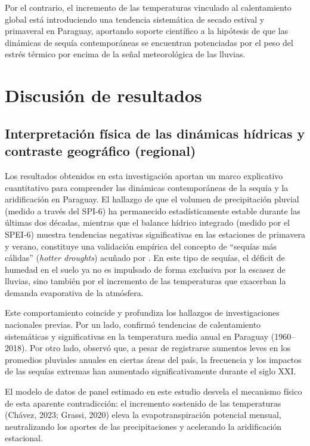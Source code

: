 Por el contrario, el incremento de las temperaturas vinculado al calentamiento global está introduciendo una tendencia sistemática de secado estival y primaveral en Paraguay, aportando soporte científico a la hipótesis de que las dinámicas de sequía contemporáneas se encuentran potenciadas por el peso del estrés térmico por encima de la señal meteorológica de las lluvias.

\section{Discusión de resultados}

\subsection{Interpretación física de las dinámicas hídricas y contraste geográfico (regional)}

Los resultados obtenidos en esta investigación aportan un marco explicativo cuantitativo para comprender las dinámicas contemporáneas de la sequía y la aridificación en Paraguay. El hallazgo de que el volumen de precipitación pluvial (medido a través del SPI-6) ha permanecido estadísticamente estable durante las últimas dos décadas, mientras que el balance hídrico integrado (medido por el SPEI-6) muestra tendencias negativas significativas en las estaciones de primavera y verano, constituye una validación empírica del concepto de ``sequías más cálidas'' (\textit{hotter droughts}) acuñado por . En este tipo de sequías, el déficit de humedad en el suelo ya no es impulsado de forma exclusiva por la escasez de lluvias, sino también por el incremento de las temperaturas que exacerban la demanda evaporativa de la atmósfera.

Este comportamiento coincide y profundiza los hallazgos de investigaciones nacionales previas. Por un lado,  confirmó tendencias de calentamiento sistemáticas y significativas en la temperatura media anual en Paraguay (1960--2018). Por otro lado,  observó que, a pesar de registrarse aumentos leves en los promedios pluviales anuales en ciertas áreas del país, la frecuencia y los impactos de las sequías extremas han aumentado significativamente durante el siglo XXI. 

El modelo de datos de panel estimado en este estudio desvela el mecanismo físico de esta aparente contradicción: el incremento sostenido de las temperaturas (Chávez, 2023; Grassi, 2020) eleva la evapotranspiración potencial mensual, neutralizando los aportes de las precipitaciones y acelerando la aridificación estacional.

